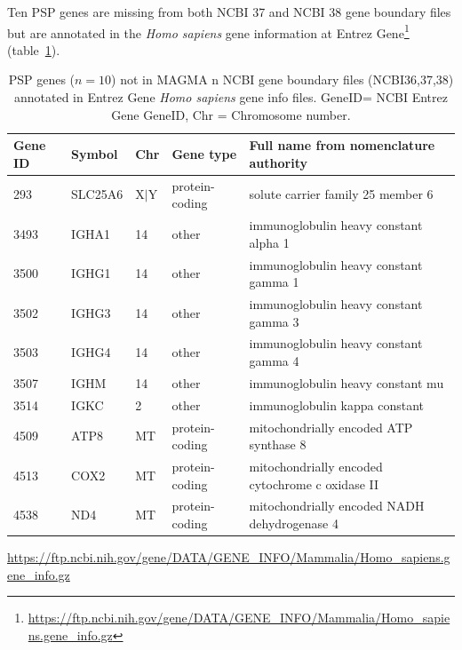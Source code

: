 Ten PSP genes are missing from both NCBI 37 and NCBI 38 gene boundary files but are annotated in the \textit{Homo sapiens} gene information at Entrez Gene\footnote{\url{https://ftp.ncbi.nih.gov/gene/DATA/GENE_INFO/Mammalia/Homo_sapiens.gene_info.gz} } (table~\ref{tab:10 synaptic genes not in NCBI 38 included with MAGMA but present in entrez gene gene info}).

\begin{table}[ht]
\centering
\setlength{\extrarowheight}{2pt}
\begin{adjustbox}{max width=\textwidth}
\begin{tabular}{lllll}
  \toprule
 Gene ID & Symbol & Chr & Gene type & Full name from nomenclature authority \\ 
  \midrule
293 & SLC25A6 & X$|$Y & protein-coding & solute carrier family 25 member 6 \\ 
  3493 & IGHA1 & 14 & other & immunoglobulin heavy constant alpha 1 \\ 
  3500 & IGHG1 & 14 & other & immunoglobulin heavy constant gamma 1 \\ 
  3502 & IGHG3 & 14 & other & immunoglobulin heavy constant gamma 3  \\ 
  3503 & IGHG4 & 14 & other & immunoglobulin heavy constant gamma 4  \\ 
  3507 & IGHM & 14 & other & immunoglobulin heavy constant mu \\ 
  3514 & IGKC & 2 & other & immunoglobulin kappa constant \\ 
  4509 & ATP8 & MT & protein-coding & mitochondrially encoded ATP synthase 8 \\ 
  4513 & COX2 & MT & protein-coding & mitochondrially encoded cytochrome c oxidase II \\ 
  4538 & ND4 & MT & protein-coding & mitochondrially encoded NADH dehydrogenase 4 \\ 
   \bottomrule
\end{tabular}
\end{adjustbox}
\caption[Synaptic genes not in NCBI boundary files in MAGMA]{PSP genes ($n=10$) not in MAGMA n NCBI gene boundary files (NCBI36,37,38) annotated in Entrez Gene \textit{Homo sapiens} gene info files.  GeneID= NCBI Entrez Gene GeneID, Chr = Chromosome number.  }
\tiny\url{https://ftp.ncbi.nih.gov/gene/DATA/GENE_INFO/Mammalia/Homo_sapiens.gene_info.gz}
\label{tab:10 synaptic genes not in NCBI 38 included with MAGMA but present in entrez gene gene info}
\end{table}


